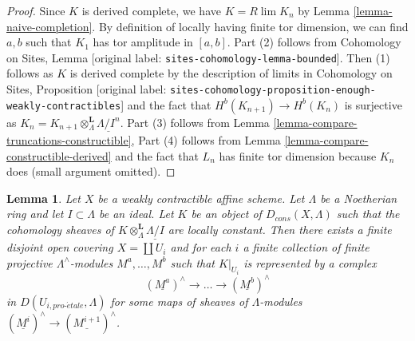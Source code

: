 \documentclass[10pt,a4paper]{article}
\theoremstyle{plain}
\newtheorem{lemma}[subsection]{Lemma}
\theoremstyle{definition}
\theoremstyle{remark}
\numberwithin{equation}{subsection}
\def\lim{\mathop{\mathrm{lim}}\nolimits}
\def\proetale{{pro\text{-}\acute{e}tale}}
\begin{document}
\begin{proof}
Since $K$ is derived complete, we have $K = R\lim K_n$ by
Lemma \ref{lemma-naive-completion}.
By definition of locally having finite tor dimension, we can find
$a, b$ such that $K_1$ has tor amplitude in $[a, b]$.
Part (2) follows from 
Cohomology on Sites, Lemma \textnormal{[original label: \nolinkurl{sites-cohomology-lemma-bounded}]}.
Then (1) follows as $K$ is derived complete by the description
of limits in
Cohomology on Sites, Proposition
\textnormal{[original label: \nolinkurl{sites-cohomology-proposition-enough-weakly-contractibles}]}
and the fact that $H^b(K_{n + 1}) \to H^b(K_n)$ is surjective
as $K_n = K_{n + 1} \otimes^\mathbf{L}_\Lambda \underline{\Lambda/I^n}$.
Part (3) follows from
Lemma \ref{lemma-compare-truncations-constructible},
Part (4) follows from
Lemma \ref{lemma-compare-constructible-derived}
and the fact that $L_n$ has finite tor dimension because $K_n$ does
(small argument omitted).
\end{proof}


\begin{lemma}
\label{lemma-local-structure-constructible-complex}
Let $X$ be a weakly contractible affine scheme. Let $\Lambda$ be a Noetherian
ring and let $I \subset \Lambda$ be an ideal. Let $K$ be an object of
$D_{cons}(X, \Lambda)$ such that the cohomology sheaves of
$K \otimes_\Lambda^\mathbf{L} \underline{\Lambda/I}$ are locally
constant. Then there exists a finite disjoint open covering
$X = \coprod U_i$ and for each $i$ a finite collection of
finite projective $\Lambda^\wedge$-modules $M^a, \ldots, M^b$
such that $K|_{U_i}$ is represented by a complex
$$
(\underline{M^a})^\wedge \to \ldots \to (\underline{M^b})^\wedge
$$
in $D(U_{i, \proetale}, \Lambda)$ for some maps of sheaves of
$\Lambda$-modules $(\underline{M^i})^\wedge \to (\underline{M^{i + 1}})^\wedge$.
\end{lemma}
\end{document}
